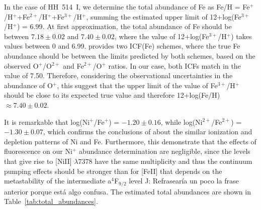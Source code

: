 \documentclass[fleqn,usenatbib]{mnras}
\newcommand{\jorge}[1]{{\color{magenta}J: #1}}
\begin{document}
In the case of HH~514~I, we determine the total abundance of Fe as Fe/H = Fe$^{+}$/H$^{+}$+Fe$^{2+}$/H$^{+}$+Fe$^{3+}$/H$^{+}$, summing the estimated upper limit of 12+log(Fe$^{3+}$/H$^{+}$) = 6.99. At first approximation, the total abundance of Fe should be between $7.18 \pm 0.02$ and $7.40 \pm 0.02$, where the value of 12+log(Fe$^{3+}$/H$^{+}$) takes values between 0 and 6.99.  \citet{rodriguez05} provides two ICF(Fe) schemes, where the true Fe abundance should be between the limits predicted by both schemes, based on the observed O$^{+}$/O$^{2+}$ and Fe$^{2+}$/O$^{+}$ ratios. In our case, both ICFs match in the value of 7.50. Therefore, considering the observational uncertainties in the abundance of O$^{+}$, this suggest that the upper limit of the value of Fe$^{3+}$/H$^{+}$ should be close to its expected true value and therefore 12+log(Fe/H)$\approx 7.40 \pm 0.02$. 

It is remarkable that log(Ni$^{+}$/Fe$^{+}$) = $-1.20 \pm 0.16$, while log(Ni$^{2+}$/Fe$^{2+}$) = $-1.30 \pm 0.07$, which confirms the conclusions of \citet{mendez2021-2} about the similar ionization and depletion patterns of Ni and Fe. Furthermore, this demonstrate that the effects of fluorescence on our Ni$^{+}$ abundance determination are negligible, since the levels that give rise to [Ni\thinspace II] $\lambda 7378$ have the same multiplicity and thus the continuum pumping effects should be stronger than for [Fe\thinspace II] that depends on the metastability of the intermediate a$^4$F$_{9/2}$ level \jorge{Refrasearía un poco la frase anterior porque está algo confusa}. The estimated total abundances are shown in Table~\ref{tab:total_abundances}.
\end{document}
